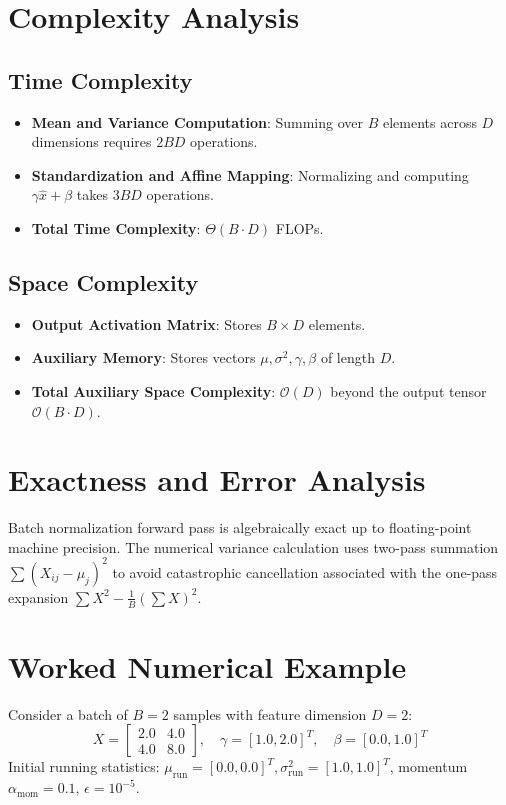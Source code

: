 \documentclass[11pt,a4paper]{article}
\theoremstyle{definition}
\begin{document}
\section{Complexity Analysis}

\subsection{Time Complexity}
\begin{itemize}
    \item \textbf{Mean and Variance Computation}: Summing over $B$ elements across $D$ dimensions requires $2BD$ operations.
    \item \textbf{Standardization and Affine Mapping}: Normalizing and computing $\gamma \hat{x} + \beta$ takes $3BD$ operations.
    \item \textbf{Total Time Complexity}: $\Theta(B \cdot D)$ FLOPs.
\end{itemize}

\subsection{Space Complexity}
\begin{itemize}
    \item \textbf{Output Activation Matrix}: Stores $B \times D$ elements.
    \item \textbf{Auxiliary Memory}: Stores vectors $\mu, \sigma^2, \gamma, \beta$ of length $D$.
    \item \textbf{Total Auxiliary Space Complexity}: $\mathcal{O}(D)$ beyond the output tensor $\mathcal{O}(B \cdot D)$.
\end{itemize}

\section{Exactness and Error Analysis}

Batch normalization forward pass is algebraically exact up to floating-point machine precision. The numerical variance calculation uses two-pass summation $\sum (X_{ij} - \mu_j)^2$ to avoid catastrophic cancellation associated with the one-pass expansion $\sum X^2 - \frac{1}{B}(\sum X)^2$.

\section{Worked Numerical Example}

Consider a batch of $B = 2$ samples with feature dimension $D = 2$:
\begin{equation}
X = \begin{bmatrix} 2.0 & 4.0 \\ 4.0 & 8.0 \end{bmatrix}, \quad \gamma = [1.0, 2.0]^T, \quad \beta = [0.0, 1.0]^T
\end{equation}
Initial running statistics: $\mu_{\text{run}} = [0.0, 0.0]^T, \sigma_{\text{run}}^2 = [1.0, 1.0]^T$, momentum $\alpha_{\text{mom}} = 0.1$, $\epsilon = 10^{-5}$.
\end{document}
